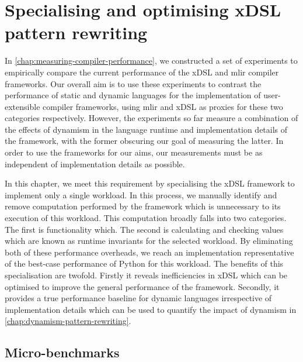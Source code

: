 \chapter{Specialising and optimising xDSL pattern rewriting}
\label{chap:specialising-optimising-pattern-rewriting}

In \autoref{chap:measuring-compiler-performance}, we constructed a set of experiments to empirically compare the current performance of the xDSL and \ac{mlir} compiler frameworks.
Our overall aim is to use these experiments to contrast the performance of static and dynamic languages for the implementation of user-extensible compiler frameworks, using \ac{mlir} and xDSL as proxies for these two categories respectively.
However, the experiments so far measure a combination of the effects of dynamism in the language runtime and implementation details of the framework, with the former obscuring our goal of measuring the latter.
In order to use the frameworks for our aims, our measurements must be as independent of implementation details as possible.

In this chapter, we meet this requirement by specialising the xDSL framework to implement only a single workload.
In this process, we manually identify and remove computation performed by the framework which is unnecessary to its execution of this workload. This computation broadly falls into two categories. The first is functionality which. %
The second is calculating and checking values which are known as runtime invariants for the selected workload. %
By eliminating both of these performance overheads, we reach an implementation representative of the best-case performance of Python for this workload.
The benefits of this specialisation are twofold. Firstly it reveals inefficiencies in xDSL which can be optimised to improve the general performance of the framework. Secondly, it provides a true performance baseline for dynamic languages irrespective of implementation details which can be used to quantify the impact of dynamism in \autoref{chap:dynamism-pattern-rewriting}.


\section{Micro-benchmarks}
\label{sec:specialising-ubenchmarks}

